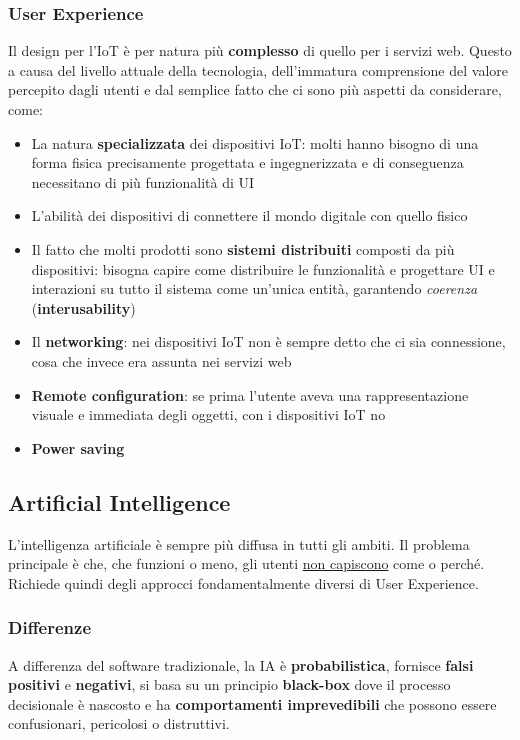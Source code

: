 \subsubsection{User Experience}
Il design per l'IoT è per natura più \textbf{complesso} di quello per i servizi web. Questo a causa del livello attuale della tecnologia, dell'immatura comprensione del valore percepito dagli utenti e dal semplice fatto che ci sono più aspetti da considerare, come:
\begin{itemize}
	\item La natura \textbf{specializzata} dei dispositivi IoT: molti hanno bisogno di una forma fisica precisamente progettata e ingegnerizzata e di conseguenza necessitano di più funzionalità di UI
	\item L'abilità dei dispositivi di connettere il mondo digitale con quello fisico
	\item Il fatto che molti prodotti sono \textbf{sistemi distribuiti} composti da più dispositivi: bisogna capire come distribuire le funzionalità e progettare UI e interazioni su tutto il sistema come un'unica entità, garantendo \textit{coerenza} (\textbf{interusability})
	\item Il \textbf{networking}: nei dispositivi IoT non è sempre detto che ci sia connessione, cosa che invece era assunta nei servizi web
	\item \textbf{Remote configuration}: se prima l'utente aveva una rappresentazione visuale e immediata degli oggetti, con i dispositivi IoT no
	\item \textbf{Power saving}
\end{itemize}

\subsection{Artificial Intelligence}
L'intelligenza artificiale è sempre più diffusa in tutti gli ambiti. Il problema principale è che, che funzioni o meno, gli utenti \underline{non capiscono} come o perché. Richiede quindi degli approcci fondamentalmente diversi di User Experience.

\subsubsection{Differenze}
A differenza del software tradizionale, la IA è \textbf{probabilistica}, fornisce \textbf{falsi positivi} e \textbf{negativi}, si basa su un principio \textbf{black-box} dove il processo decisionale è nascosto e ha \textbf{comportamenti imprevedibili} che possono essere confusionari, pericolosi o distruttivi.

